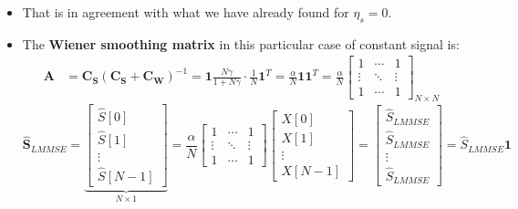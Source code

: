 \begin{itemize}
\begin{align*}
&= \gamma \mathbf{1} \left( \mathbf{1}^T - \frac{N\gamma}{1+N\gamma} \mathbf{1}^T \right) \mathbf{X} = \gamma \mathbf{1} \left( 1 - \frac{N\gamma}{1+N\gamma} \right) \mathbf{1}^T \mathbf{X} = \mathbf{1} \frac{N\gamma}{1+N\gamma} \cdot \frac{1}{N} \mathbf{1}^T \mathbf{X} = (\alpha \mathbf{\bar{X}}) \mathbf{1} \\[8pt]
\text{where } \alpha &\triangleq \frac{N\gamma}{1+N\gamma}, \quad \mathbf{\bar{X}} \text{ is the Sample Mean, and } \mathbf{\hat{S}}_{LMMSE} = \alpha \mathbf{\bar{X}}
\end{align*}
\item That is in agreement with what we have already found for \(\eta_s=0\).
\item The \textbf{Wiener smoothing matrix} in this particular case of constant signal is:
\begin{align*}
\mathbf{A} &= \mathbf{C}_{\mathbf{S}}(\mathbf{C}_{\mathbf{S}} + \mathbf{C}_{\mathbf{W}})^{-1} = \mathbf{1}\frac{N\gamma}{1+N\gamma} \cdot \frac{1}{N} \mathbf{1}^T = \frac{\alpha}{N} \mathbf{1}\mathbf{1}^T = \frac{\alpha}{N} \begin{bmatrix} 1 & \cdots & 1 \\ \vdots & \ddots & \vdots \\ 1 & \cdots & 1 \end{bmatrix}_{N \times N}
\end{align*}
$$
\mathbf{\hat{S}}_{LMMSE} = \underbrace{\begin{bmatrix} \hat{S}[0] \\ \hat{S}[1] \\ \vdots \\ \hat{S}[N-1] \end{bmatrix}}_{N \times 1} = \frac{\alpha}{N} \begin{bmatrix} 1 & \cdots & 1 \\ \vdots & \ddots & \vdots \\ 1 & \cdots & 1 \end{bmatrix} \begin{bmatrix} X[0] \\ X[1] \\ \vdots \\ X[N-1] \end{bmatrix} = \begin{bmatrix} \hat{S}_{LMMSE} \\ \hat{S}_{LMMSE} \\ \vdots \\ \hat{S}_{LMMSE} \end{bmatrix} = \hat{S}_{LMMSE} \mathbf{1}
$$


\end{itemize}
